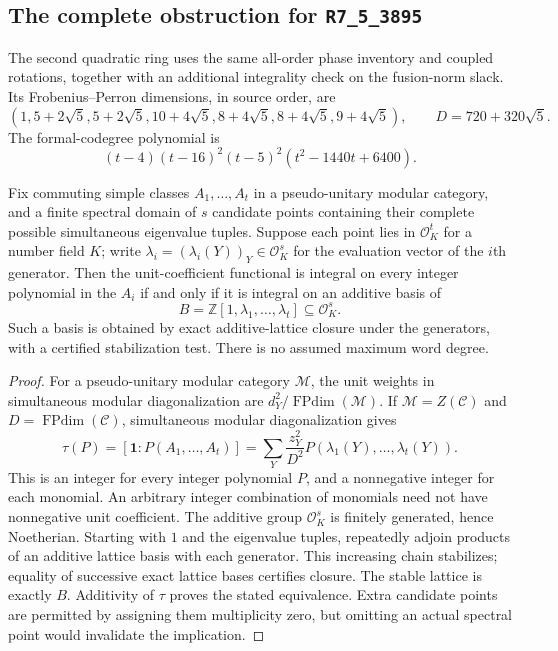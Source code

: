 \subsection{The complete obstruction for \texttt{R7\_5\_3895}}
\label{sec:m5-3895-cyclic}

The second quadratic ring uses the same all-order phase inventory and
coupled rotations, together with an additional integrality check on the
fusion-norm slack.  Its Frobenius--Perron dimensions, in source order, are
\[
 (1,5+2\sqrt5,5+2\sqrt5,10+4\sqrt5,
   8+4\sqrt5,8+4\sqrt5,9+4\sqrt5),
 \qquad D=720+320\sqrt5.
\]
The formal-codegree polynomial is
\[
 (t-4)(t-16)^2(t-5)^2(t^2-1440t+6400).
\]

\begin{proposition}
\label{prop:m5-all-word-integrality}
Fix commuting simple classes $A_1,\ldots,A_t$ in a pseudo-unitary
modular category, and a finite spectral domain of $s$ candidate points
containing their complete possible simultaneous eigenvalue tuples.
Suppose each point lies in $\mathcal O_K^t$ for a number field $K$;
write $\lambda_i=(\lambda_i(Y))_Y\in\mathcal O_K^s$ for the
evaluation vector of the $i$th generator.  Then the unit-coefficient functional
is integral on every integer polynomial in the $A_i$ if and only if it
is integral on an additive basis of
\[
 B=\mathbb Z[1,\lambda_1,\ldots,\lambda_t]
       \subseteq\mathcal O_K^s.
\]
Such a basis is obtained by exact additive-lattice closure under the
generators, with a certified stabilization test.  There is no assumed
maximum word degree.
\end{proposition}
\begin{proof}
For a pseudo-unitary modular category $\mathcal M$, the unit weights
in simultaneous modular diagonalization are
$d_Y^2/\operatorname{FPdim}(\mathcal M)$.  If $\mathcal M=Z(\mathcal C)$ and
$D=\operatorname{FPdim}(\mathcal C)$, simultaneous modular
diagonalization gives
\[
 \tau(P)=[\mathbf1:P(A_1,\ldots,A_t)]
      =\sum_Y\frac{z_Y^2}{D^2}P(\lambda_1(Y),\ldots,\lambda_t(Y)).
\]
This is an integer for every integer polynomial $P$, and a nonnegative
integer for each monomial.  An arbitrary integer combination of
monomials need not have nonnegative unit coefficient.
The additive group $\mathcal O_K^s$ is finitely generated, hence
Noetherian.  Starting with $1$ and the eigenvalue tuples, repeatedly
adjoin products of an additive lattice basis with each generator.
This increasing chain stabilizes; equality of successive exact lattice
bases certifies closure.  The stable lattice is exactly $B$.
Additivity of $\tau$ proves the stated equivalence.  Extra candidate
points are permitted by assigning them multiplicity zero, but omitting
an actual spectral point would invalidate the implication.
\end{proof}

